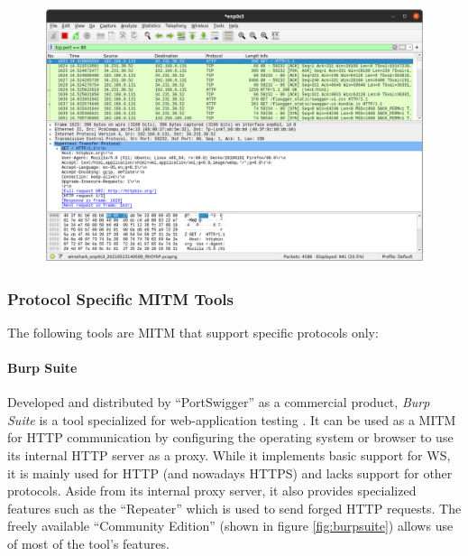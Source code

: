 \begin{figure}[h]
    \centering
    \includegraphics[width=14cm]{img/ch03/wireshark.png}
    \label{fig:wireshark}
\end{figure}

\subsubsection{Protocol Specific \ac{MITM} Tools}
The following tools are \ac{MITM} that support specific protocols only:

\paragraph{Burp Suite} Developed and distributed by \enquote{PortSwigger} as a commercial product, \emph{Burp Suite} is a tool specialized for web-application testing \cite{burpsuite}. It can be used as a \ac{MITM} for \ac{HTTP} communication by configuring the operating system or browser to use its internal \ac{HTTP} server as a proxy. While it implements basic support for \ac{WS}, it is mainly used for \ac{HTTP} (and nowadays \ac{HTTPS}) and lacks support for other protocols. Aside from its internal proxy server, it also provides specialized features such as the \enquote{Repeater} which is used to send forged \ac{HTTP} requests. The freely available \enquote{Community Edition} (shown in figure \ref{fig:burpsuite}) allows use of most of the tool's features.

